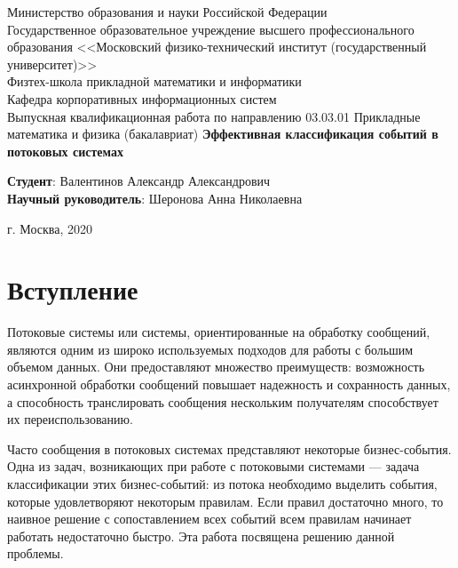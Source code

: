 \documentclass[14pt]{article}
\begin{document}
\begin{titlepage}
    \begin{center}
        Министерство образования и науки Российской Федерации\\
        \vspace{4mm}
        Государственное образовательное учреждение высшего профессионального образования <<Московский физико-технический институт (государственный университет)>>\\
        \vspace{4mm}
        Физтех-школа прикладной математики и информатики\\
        \vspace{4mm}
        Кафедра корпоративных информационных систем\\
        \vspace{4mm}
        Выпускная квалификационная работа по направлению 03.03.01 Прикладные
математика и физика (бакалавриат)
        \vfill
        {\LARGE \textbf{Эффективная классификация событий в потоковых системах}}\\
        \vfill
        \begin{addmargin}[4cm]{0cm}
        \textbf{Студент}: Валентинов Александр Александрович\\
        \textbf{Научный руководитель}: Шеронова Анна Николаевна
        \end{addmargin}
        \vfill
        г. Москва, 2020
    \end{center}
\end{titlepage}

\clearpage
\tableofcontents
\clearpage
\section{Вступление}
Потоковые системы или системы, ориентированные на обработку сообщений, являются одним из широко используемых подходов для работы с большим объемом данных. Они предоставляют множество преимуществ: возможность асинхронной обработки сообщений повышает надежность и сохранность данных, а способность транслировать сообщения нескольким получателям способствует их переиспользованию.

Часто сообщения в потоковых системах представляют некоторые бизнес-события. Одна из задач, возникающих при работе с потоковыми системами --- задача классификации этих бизнес-событий: из потока необходимо выделить события, которые удовлетворяют некоторым правилам. Если правил достаточно много, то наивное решение с сопоставлением всех событий всем правилам начинает работать недостаточно быстро. Эта работа посвящена решению данной проблемы.
\end{document}
